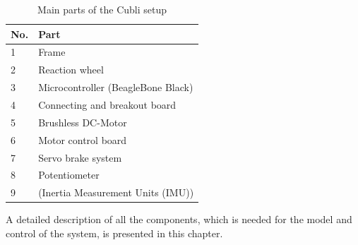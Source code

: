 \begin{table}[H]
	\begin{tabular}{|l|p{6.7cm}|}
		\hline %
		\textbf{No.} &\textbf{Part} 			\\
		\hline %
		1            & Frame           			\\
		\hline %
		2            & Reaction wheel      		\\
		\hline %
		3            & Microcontroller (BeagleBone Black)  \\
		\hline %
		4            & Connecting and breakout board 			\\
		\hline %
		5            & Brushless DC-Motor       			\\
		\hline %
		6            & Motor control board   	\\
		\hline %
		7            & Servo brake system     	\\
		\hline %
		8            & Potentiometer 		    	\\
		\hline %
		9            & (Inertia Measurement Units (IMU)) 		    	\\
		\hline %
	\end{tabular}
	\caption{Main parts of the Cubli setup}
	\label{TableAAUCubliComponent}
\end{table}

A detailed description of all the components, which is needed for the model and control of the system, is presented in this chapter.


